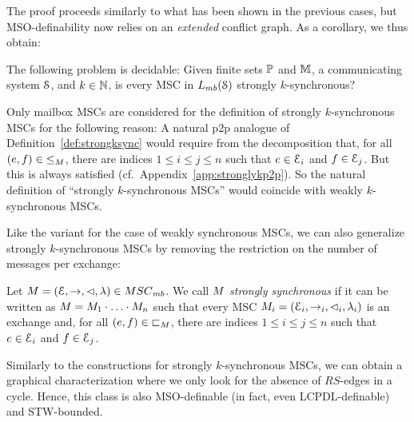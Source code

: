 \documentclass[a4paper,UKenglish,cleveref, autoref, thm-restate]{lipics-v2021}
\begin{document}
The proof proceeds similarly to what has been shown in the previous cases,
but MSO-definability now relies on an \emph{extended} conflict graph.
As a corollary, we thus obtain:

\begin{theorem}\label{thm:strong-sync}
The following problem is decidable:
Given finite sets $\mathbb{P}$ and $\mathbb{M}$, a communicating system $\mathcal{S}$, and $k \in \mathbb{N}$,
is every MSC in $\mbL{\System}$ strongly $k$-synchronous?
\end{theorem}



\begin{remark}
\label{rem:stronglykp2p}
	Only mailbox MSCs are considered for the definition of
	strongly $k$-synchronous MSCs
	for the following reason:
	A natural p2p analogue of Definition~\ref{def:strongksync}
	would require from the decomposition that, for all $(e,f) \in {\le}_M$, there are indices $1 \le i \le j \le n$
	such that $e \in \mathcal{E}_i$ and $f \in \mathcal{E}_j$. But this is always satisfied
	(cf.\ Appendix~\ref{app:stronglykp2p}). So the natural definition of ``strongly $k$-synchronous MSCs'' would coincide with weakly $k$-synchronous MSCs.
\end{remark}

Like the variant for the case of weakly synchronous MSCs, we can also generalize strongly $k$-synchronous MSCs by removing the restriction on the number of messages per exchange:

\begin{definition}\label{def:strongsync}
	Let $\msc = (\Events,\procrel,\lhd,\lambda) \in \mbMSCs$.
	We call $M$ \emph{strongly synchronous}
	if it can be written as
	$M = M_1 \cdot \ldots \cdot M_n$ %
	such that every MSC $M_i = (\mathcal{E}_i,\to_i,\lhd_i,\lambda_i)$ is an exchange
	and, for all $(e,f) \in {\sqsubset}_M$, there are indices $1 \le i \le j \le n$
	such that $e \in \mathcal{E}_i$ and $f \in \mathcal{E}_j$.
\end{definition}

Similarly to the constructions for strongly $k$-synchronous MSCs, we can obtain a graphical characterization where we only look for the absence of $RS$-edges in a cycle. Hence, this class is also MSO-definable (in fact, even LCPDL-definable) and STW-bounded.
\end{document}
